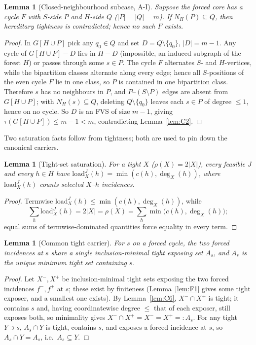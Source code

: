 \documentclass[11pt]{article}
\theoremstyle{plain}
\newtheorem{lemma}[theorem]{Lemma}
\theoremstyle{definition}
\newcommand{\FVS}{\tau}
\begin{document}
\begin{lemma}[Closed-neighbourhood subcase, A-I]\label{lem:Aone}
Suppose the forced core has a cycle $F$ with $S$-side $P$ and $H$-side $Q$
($|P|=|Q|=m$). If $N_H(P)\subseteq Q$, then hereditary tightness is contradicted;
hence no such $F$ exists.
\end{lemma}

\begin{proof}
In $G[H\cup P]$ pick any $q_0\in Q$ and set $D=Q\setminus\{q_0\}$, $|D|=m-1$. Any
cycle of $G[H\cup P]-D$ lies in $H-D$ (impossible, an induced subgraph of the
forest $H$) or passes through some $s\in P$. The cycle $F$ alternates $S$- and
$H$-vertices, while the bipartition classes alternate along every edge; hence all
$S$-positions of the even cycle $F$ lie in one class, so $P$ is contained in one
bipartition class. Therefore $s$ has no neighbours in $P$, and $P$--$(S\setminus P)$ edges are absent from
$G[H\cup P]$; with $N_H(s)\subseteq Q$, deleting $Q\setminus\{q_0\}$ leaves each
$s\in P$ of degree $\le1$, hence on no cycle. So $D$ is an FVS of size $m-1$,
giving $\FVS(G[H\cup P])\le m-1<m$, contradicting Lemma~\ref{lem:C2}.
\end{proof}

Two saturation facts follow from tightness; both are used to pin down the
canonical carriers.

\begin{lemma}[Tight-set saturation]\label{lem:sat}
For a tight $X$ ($\rho(X)=2|X|$), every feasible $J$ and every $h\in H$ have
$\mathrm{load}^J_X(h)=\min(c(h),\deg_X(h))$, where $\mathrm{load}^J_X(h)$ counts
selected $X$--$h$ incidences.
\end{lemma}

\begin{proof}
Termwise $\mathrm{load}^J_X(h)\le\min(c(h),\deg_X(h))$, while
\[
\sum_h\mathrm{load}^J_X(h)=2|X|=\rho(X)=\sum_h\min\bigl(c(h),\deg_X(h)\bigr);
\]
equal sums of termwise-dominated quantities force equality in every term.
\end{proof}

\begin{lemma}[Common tight carrier]\label{lem:carrier}
For $s$ on a forced cycle, the two forced incidences at $s$ share a single
inclusion-minimal tight exposing set $A_s$, and $A_s$ is the unique minimum tight
set containing $s$.
\end{lemma}

\begin{proof}
Let $X^-,X^+$ be inclusion-minimal tight sets exposing the two forced incidences
$f^-,f^+$ at $s$; these exist by finiteness (Lemma~\ref{lem:F1} gives some tight
exposer, and a smallest one exists). By
Lemma~\ref{lem:C6}, $X^-\cap X^+$ is tight; it contains $s$ and, having
coordinatewise degree $\le$ that of each exposer, still exposes both, so
minimality gives $X^-\cap X^+=X^-=X^+=:A_s$. For any tight $Y\ni s$, $A_s\cap Y$
is tight, contains $s$, and exposes a forced incidence at $s$, so
$A_s\cap Y=A_s$, i.e.\ $A_s\subseteq Y$.
\end{proof}
\end{document}
